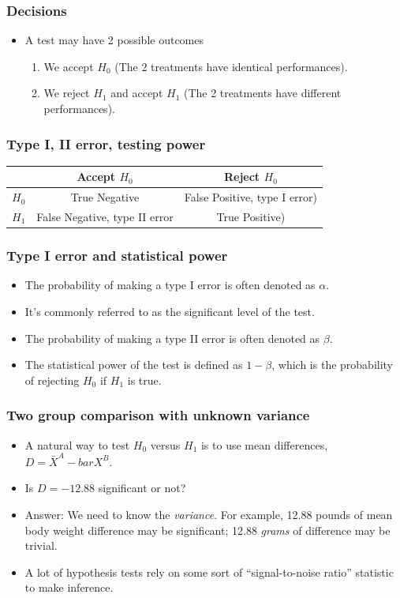 \begin{frame}
  \frametitle{Decisions}
  \begin{itemize}
  \item A test may have 2 possible outcomes
    \begin{enumerate}
    \item We accept $H_{0}$ (The 2 treatments have identical
      performances).
    \item We reject $H_{1}$ and accept $H_{1}$ (The 2 treatments have
      different performances).
    \end{enumerate}
  \end{itemize}
\end{frame}

\begin{frame}
  \frametitle{Type I, II error, testing power}
  \begin{tabular}{|l|c|c|}
    & Accept $H_0$ & Reject $H_0$ \\
    \hline
    $H_0$  & True Negative & False Positive, type I error) \\
    \hline
    $H_1$  & False Negative, type II error & True Positive) \\
  \end{tabular}
\end{frame}

\begin{frame}
  \frametitle{Type I error and statistical power}
  \begin{itemize}
  \item The probability of making a type I error is often denoted as
    $\alpha$.
  \item It's commonly referred to as the \alert{significant level} of the test.
  \item The probability of making a type II error is often denoted as
    $\beta$.
  \item The \alert{statistical power} of the test is defined as
    $1-\beta$, which is the probability of rejecting $H_{0}$ if
    $H_{1}$ is true.
  \end{itemize}
\end{frame}

\begin{frame}
  \frametitle{Two group comparison with unknown variance}
  \begin{itemize}
  \item A natural way to test $H_{0}$ versus $H_{1}$ is to use mean
    differences, $D = \bar{X}^{A} - bar{X}^{B}$.
  \item Is $D = -12.88$ significant or not?
  \item Answer: We need to know the \emph{variance}.  For example,
    12.88 pounds of mean body weight difference may be significant;
    12.88 \emph{grams} of difference may be trivial.
  \item A lot of hypothesis tests rely on some sort of
    ``signal-to-noise ratio'' statistic to make inference.
  \end{itemize}
\end{frame}

